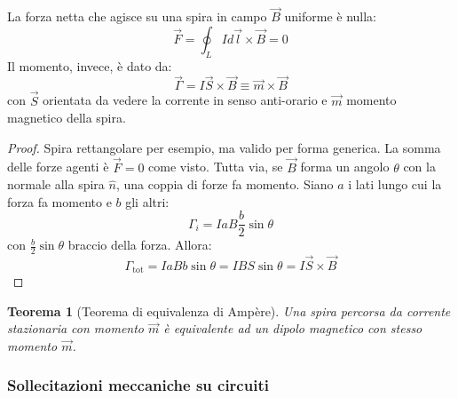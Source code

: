 \documentclass[10pt, a4paper]{scrartcl}
\numberwithin{equation}{subsection}
\theoremstyle{style1}
\newtheorem{teorema}{Teorema}[section]
\newenvironment{boxenv}[1][]{
    \begin{eqbox}[#1]
    }{
   \end{eqbox}
}
\begin{document}
La forza netta che agisce su una spira in campo $\vec{B}$ uniforme \`e nulla:
\begin{equation}
	\vec{F} = \oint_{L} I d\vec{l} \times \vec{B} =0 
\end{equation}
Il momento, invece, \`e dato da:
\begin{equation}
	\vec{\Gamma} = I\vec{S} \times \vec{B}\equiv \vec{m}\times \vec{B}
\end{equation}
con $\vec{S}$ orientata da vedere la corrente in senso anti-orario e $\vec{m}$ momento magnetico della spira.
\begin{boxenv}[]
\begin{proof}
	Spira rettangolare per esempio, ma valido per forma generica. La somma delle forze agenti \`e $\vec{F} = 0$ come visto. Tutta via, se $\vec{B}$ forma un angolo $\theta $ con la normale alla spira $\hat{n}$, una coppia di forze fa momento. Siano $a$ i lati lungo cui la forza fa momento e $b$ gli altri:
	\begin{equation}
		\Gamma_i = IaB \frac{b}{2}\sin\theta 
	\end{equation}
	con $\frac{b}{2}\sin \theta $ braccio della forza. Allora:
	\begin{equation}
\Gamma_\text{tot} = IaB b \sin \theta  = IB S \sin \theta = I \vec{S}\times \vec{B} 
	\end{equation}
\end{proof}
\end{boxenv}
\begin{teorema}
	[Teorema di equivalenza di Amp\`ere]
	Una spira percorsa da corrente stazionaria con momento $\vec{m}$ \`e equivalente ad un dipolo magnetico con stesso momento $\vec{m}$.
\end{teorema}
\subsubsection{Sollecitazioni meccaniche su circuiti}
\end{document}

